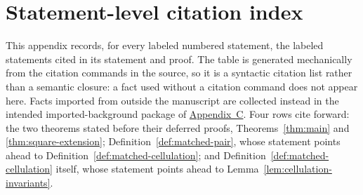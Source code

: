 \documentclass[11pt]{article}
\theoremstyle{mainplain}
\theoremstyle{mainroman}
\theoremstyle{definition}
\numberwithin{equation}{section}
\begin{document}
\appendix
\section{Statement-level citation index}\label{app:dependency-graph}

This appendix records, for every labeled numbered statement, the
labeled statements cited in its statement and proof. The table is
generated mechanically from the citation commands in the source, so it
is a syntactic citation list rather than a semantic closure: a fact
used without a citation command does not appear here. Facts imported
from outside the manuscript are collected instead in the intended
imported-background package of
\hyperref[app:background]{Appendix~C}.
Four rows cite forward: the two theorems stated before their
deferred proofs, Theorems~\ref{thm:main} and
\ref{thm:square-extension}; Definition~\ref{def:matched-pair}, whose
statement points ahead to Definition~\ref{def:matched-cellulation};
and Definition~\ref{def:matched-cellulation} itself, whose statement
points ahead to Lemma~\ref{lem:cellulation-invariants}.
\end{document}
